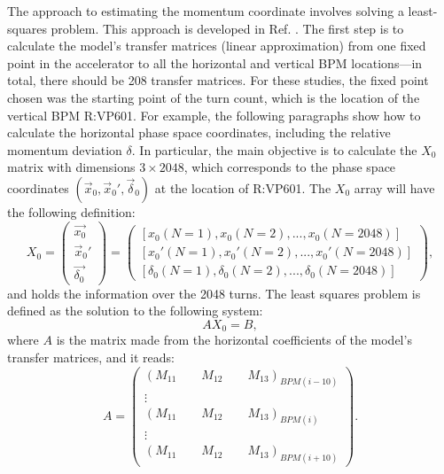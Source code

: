 The approach to estimating the momentum coordinate involves solving a least-squares problem. This approach is developed in Ref. \cite{yang}. The first step is to calculate the model's transfer matrices (linear approximation) from one fixed point in the accelerator to all the horizontal and vertical BPM locations---in total, there should be 208 transfer matrices. For these studies, the fixed point chosen was the starting point of the turn count, which is the location of the vertical BPM R:VP601. For example, the following paragraphs show how to calculate the horizontal phase space coordinates, including the relative momentum deviation $\delta$. In particular, the main objective is to calculate the $X_0$ matrix with dimensions $3\times2048$, which corresponds to the phase space coordinates $\left( \vec{x}_0, \vec{x}_0', \vec{\delta}_0 \right)$ at the location of R:VP601. The $X_0$ array will have the following definition:
\begin{equation}
    \label{eq:x0vec}
    X_0= 
    \begin{pmatrix}
        \vec{x_0} \\
        \vec{x}_0' \\
        \vec{\delta_0}
    \end{pmatrix} = 
    \begin{pmatrix}
        \left[ x_0(N=1), x_0(N=2), ...,x_0(N=2048) \right] \\
        \left[ x_0'(N=1), x_0'(N=2), ..., x_0'(N=2048) \right] \\
        \left[ \delta_0 (N=1), \delta_0 (N=2), ..., \delta_0 (N=2048) \right]
    \end{pmatrix},
\end{equation}  
and holds the information over the 2048 turns. The least squares problem is defined as the solution to the following system:
\begin{equation}
    \label{eq:lsq}
    A X_0 = B,
\end{equation}
where $A$ is the matrix made from the horizontal coefficients of the model's transfer matrices, and it reads: 
\begin{equation}
\label{eq:alsq}
    A =
    \begin{pmatrix}
    \left( M_{11} \qquad M_{12} \qquad M_{13} \right)_{BPM(i-10)} \\
    \vdots \\
    \left( M_{11} \qquad M_{12} \qquad M_{13} \right)_{BPM(i)}  \\
    \vdots \\
    \left( M_{11} \qquad M_{12} \qquad M_{13} \right)_{BPM(i+10)} 
    \end{pmatrix}.
\end{equation}
